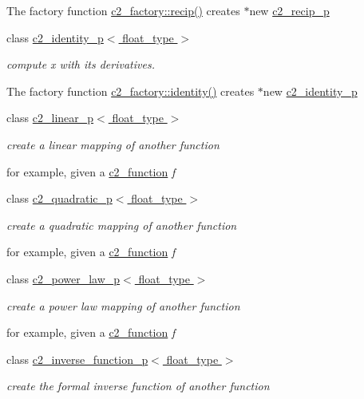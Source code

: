 \begin{DoxyCompactItemize}
\begin{DoxyCompactList}
The factory function \hyperlink{classc2__factory_adda01279d6b1059843e2aecc5be5d95e}{c2\-\_\-factory\-::recip()} creates $\ast$new \hyperlink{classc2__recip__p}{c2\-\_\-recip\-\_\-p} \end{DoxyCompactList}\item 
class \hyperlink{classc2__identity__p}{c2\-\_\-identity\-\_\-p$<$ float\-\_\-type $>$}
\begin{DoxyCompactList}\small\item\em compute x with its derivatives.

The factory function \hyperlink{classc2__factory_a66970667d203c0e63a016b08d2472dc4}{c2\-\_\-factory\-::identity()} creates $\ast$new \hyperlink{classc2__identity__p}{c2\-\_\-identity\-\_\-p} \end{DoxyCompactList}\item 
class \hyperlink{classc2__linear__p}{c2\-\_\-linear\-\_\-p$<$ float\-\_\-type $>$}
\begin{DoxyCompactList}\small\item\em create a linear mapping of another function

for example, given a \hyperlink{classc2__function}{c2\-\_\-function} {\itshape f} \end{DoxyCompactList}\item 
class \hyperlink{classc2__quadratic__p}{c2\-\_\-quadratic\-\_\-p$<$ float\-\_\-type $>$}
\begin{DoxyCompactList}\small\item\em create a quadratic mapping of another function

for example, given a \hyperlink{classc2__function}{c2\-\_\-function} {\itshape f} \end{DoxyCompactList}\item 
class \hyperlink{classc2__power__law__p}{c2\-\_\-power\-\_\-law\-\_\-p$<$ float\-\_\-type $>$}
\begin{DoxyCompactList}\small\item\em create a power law mapping of another function

for example, given a \hyperlink{classc2__function}{c2\-\_\-function} {\itshape f} \end{DoxyCompactList}\item 
class \hyperlink{classc2__inverse__function__p}{c2\-\_\-inverse\-\_\-function\-\_\-p$<$ float\-\_\-type $>$}
\begin{DoxyCompactList}\small\item\em create the formal inverse function of another function


\end{DoxyCompactList}
\end{DoxyCompactItemize}
